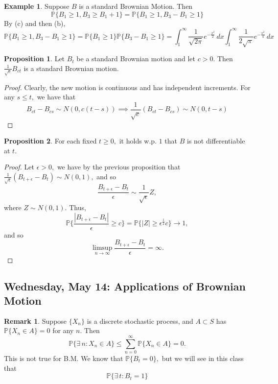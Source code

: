 \documentclass[10pt, oneside]{article}
\newcommand{\bbP}{\mathbb{P}}
\theoremstyle{definition}
\newtheorem{exmp}{Example}[section]
\newtheorem{prop}{Proposition}
\newtheorem{rem}{Remark}
\begin{document}
\begin{exmp}
    Suppose $B$ is a standard Brownian Motion. Then 
    \[\bbP\{B_1 \geq 1, B_3 \geq B_1 + 1\} = \bbP\{B_1 \geq 1, B_3 - B_1 \geq 1\}\] By (c) and then (b), 
    \[\bbP\{B_1 \geq 1, B_3 - B_1 \geq 1\} = \bbP\{B_1 \geq 1\} \bbP\{B_3 - B_1 \geq 1\} = \int_1^\infty \frac{1}{\sqrt{2\pi}}e^{-\frac{x^2}{2}}\, dx\int_1^\infty \frac{1}{2\sqrt{\pi }}e^{-\frac{x^2}{4}}\,dx\]
\end{exmp}
\begin{prop}
    Let $B_t$ be a standard Brownian motion and let $c >0.$ Then $\frac{1}{\sqrt{c}}B_{ct}$ is a standard Brownian motion. 
    \end{prop}
    \begin{proof}
    Clearly, the new motion is continuous and has independent increments. For any $s\leq t,$ we have that 
    \[B_{ct} - B_{cs} \sim N(0, c(t-s)) \implies \frac{1}{\sqrt{c}}(B_{ct} - B_{cs})\sim N(0,t-s)\]
\end{proof}
\begin{prop}
    For each fixed $t\geq 0,$ it holds w.p. $1$ that $B$ is not differentiable at $t.$
\end{prop}
\begin{proof}
    Let $\epsilon>0,$ we have by the previous proposition that $\frac{1}{\sqrt{\epsilon}}(B_{t + \epsilon } - B_t)\sim N(0,1),$ and so 
    \[\frac{B_{t + \epsilon} - B_t}{\epsilon} \sim \frac{1}{\sqrt{\epsilon}} Z,\] where $Z\sim N(0,1).$ Thus, 
    \[\bbP\{\frac{|B_{t + \epsilon} - B_t|}{\epsilon} \geq c\} = \bbP\{|Z| \geq \epsilon^\frac{1}{2}c\} \to 1,\] and so 
    \[\limsup_{n\to \infty}\frac{B_{t + \epsilon} - B_t}{\epsilon} = \infty.\]
\end{proof}

\newpage
\subsection*{Wednesday, May 14: Applications of Brownian Motion}
\begin{rem}
    Suppose $\{X_n\}$ is a discrete stochastic process, and $A\subset S$ has $\bbP\{X_n \in A\}= 0$ for any $n.$ Then 
    \[\bbP\{\exists \, n : X_n \in A\} \leq \sum_{n=0}^\infty \bbP\{X_n \in A\} = 0.\] This is not true for B.M. We know that $\bbP\{B_t = 0\},$ but we will see in this class that 
    \[\bbP\{\exists \, t : B_t = 1\}\]
\end{rem}
\end{document}
